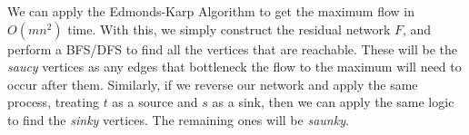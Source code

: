 \documentclass{article}
\begin{document}
\begin{solution}
We can apply the Edmonds-Karp Algorithm to get the maximum flow in $O(mn^2)$ time. With this, we simply construct the residual network $F$, and perform a BFS/DFS to find all the vertices that are reachable. These will be the \emph{saucy} vertices as any edges that bottleneck the flow to the maximum will need to occur after them. Similarly, if we reverse our network and apply the same process, treating $t$ as a source and $s$ as a sink, then we can apply the same logic to find the \emph{sinky} vertices. The remaining ones will be \emph{saunky}.
\end{solution}
\end{document}
